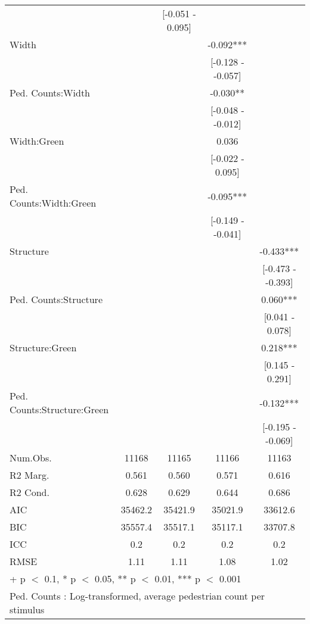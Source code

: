 \begin{table}
\begin{tabular}[t]{lcccc}
 &  & {}[-0.051 - 0.095] &  & \\
Width &  &  & -0.092*** & \\
 &  &  & {}[-0.128 - -0.057] & \\
Ped. Counts:Width &  &  & -0.030** & \\
 &  &  & {}[-0.048 - -0.012] & \\
Width:Green &  &  & 0.036 & \\
 &  &  & {}[-0.022 - 0.095] & \\
Ped. Counts:Width:Green &  &  & -0.095*** & \\
 &  &  & {}[-0.149 - -0.041] & \\
Structure &  &  &  & -0.433***\\
 &  &  &  & {}[-0.473 - -0.393]\\
Ped. Counts:Structure &  &  &  & 0.060***\\
 &  &  &  & {}[0.041 - 0.078]\\
Structure:Green &  &  &  & 0.218***\\
 &  &  &  & {}[0.145 - 0.291]\\
Ped. Counts:Structure:Green &  &  &  & -0.132***\\
 &  &  &  & {}[-0.195 - -0.069]\\
\midrule
Num.Obs. & 11168 & 11165 & 11166 & 11163\\
R2 Marg. & 0.561 & 0.560 & 0.571 & 0.616\\
R2 Cond. & 0.628 & 0.629 & 0.644 & 0.686\\
AIC & 35462.2 & 35421.9 & 35021.9 & 33612.6\\
BIC & 35557.4 & 35517.1 & 35117.1 & 33707.8\\
ICC & 0.2 & 0.2 & 0.2 & 0.2\\
RMSE & 1.11 & 1.11 & 1.08 & 1.02\\
\bottomrule
\multicolumn{5}{l}{\rule{0pt}{1em}+ p $<$ 0.1, * p $<$ 0.05, ** p $<$ 0.01, *** p $<$ 0.001}\\
\multicolumn{5}{l}{\rule{0pt}{1em}Ped. Counts : Log-transformed, average pedestrian count per stimulus}\\
\end{tabular}
\end{table}
